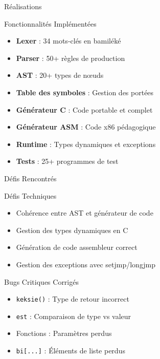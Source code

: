 \documentclass[10pt]{beamer}
\begin{document}
\begin{frame}{Réalisations}
    \begin{block}{Fonctionnalités Implémentées}
        \begin{itemize}
            \item \textbf{Lexer} : 34 mots-clés en bamiléké
            \item \textbf{Parser} : 50+ règles de production
            \item \textbf{AST} : 20+ types de nœuds
            \item \textbf{Table des symboles} : Gestion des portées
            \item \textbf{Générateur C} : Code portable et complet
            \item \textbf{Générateur ASM} : Code x86 pédagogique
            \item \textbf{Runtime} : Types dynamiques et exceptions
            \item \textbf{Tests} : 25+ programmes de test
        \end{itemize}
    \end{block}
\end{frame}

\begin{frame}{Défis Rencontrés}
    \begin{block}{Défis Techniques}
        \begin{itemize}
            \item Cohérence entre AST et générateur de code
            \item Gestion des types dynamiques en C
            \item Génération de code assembleur correct
            \item Gestion des exceptions avec setjmp/longjmp
        \end{itemize}
    \end{block}
    
    \begin{block}{Bugs Critiques Corrigés}
        \begin{itemize}
            \item \texttt{keksie()} : Type de retour incorrect
            \item \texttt{est} : Comparaison de type vs valeur
            \item Fonctions : Paramètres perdus
            \item \texttt{bi[...]} : Éléments de liste perdus
        \end{itemize}
    \end{block}
\end{frame}
\end{document}
